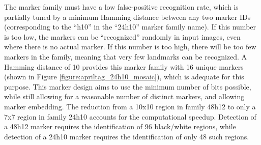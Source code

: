 The marker family must have a low false-positive recognition rate, which is partially tuned by a minimum Hamming distance
between any two marker IDs (corresponding to the ``h10'' in the ``24h10'' marker family name).
If this number is too low, the markers can be ``recognized'' randomly in input images, even where there is no actual marker.
If this number is too high, there will be too few markers in the family, meaning that very few landmarks can be recognized.
A Hamming distance of 10 provides this marker family with 16 unique markers (shown in Figure \ref{figure:apriltag_24h10_mosaic}), which is adequate for this purpose.
This marker design aims to use the minimum number of bits possible, while still allowing for a reasonable number of distinct markers,
and allowing marker embedding.
The reduction from a 10x10 region in family 48h12 to only a 7x7 region in family 24h10 accounts for the computational speedup.
Detection of a 48h12 marker requires the identification of 96 black/white regions, while detection of a 24h10 marker requires
the identification of only 48 such regions.

